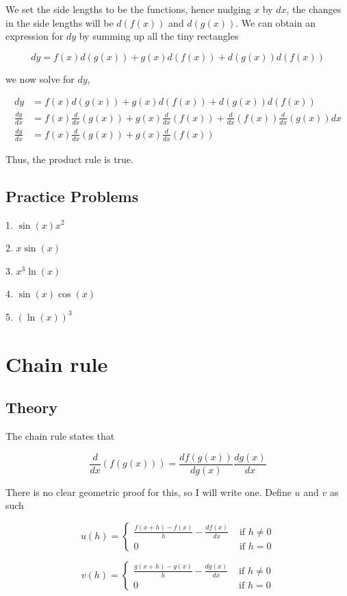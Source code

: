 \documentclass[a4paper,12pt,oneside]{book}
\begin{document}
\noindent We set the side lengths to be the functions, hence nudging $x$ by $dx$, the changes in the side lengths will be $d(f(x))$ and $d(g(x))$. We can obtain an expression for $dy$ by summing up all the tiny rectangles

$$dy=f(x)d(g(x))+g(x)d(f(x))+d(g(x))d(f(x))$$

\noindent we now solve for $dy$,

$$\begin{aligned}
dy&=f(x)d(g(x))+g(x)d(f(x))+d(g(x))d(f(x))\\
\frac{dy}{dx}&=f(x)\frac{d}{dx}(g(x))+g(x)\frac{d}{dx}(f(x))+\frac{d}{dx}(f(x))\frac{d}{dx}(g(x))dx\\
\frac{dy}{dx}&=f(x)\frac{d}{dx}(g(x))+g(x)\frac{d}{dx}(f(x))
\end{aligned}$$

\noindent Thus, the product rule is true.

\subsection{Practice Problems}

1. $\sin(x)x^2$

2. $x\sin(x)$

3. $x^3\ln(x)$

4. $\sin(x)\cos(x)$

5. $(\ln(x))^3$

\section{Chain rule}

\subsection{Theory}

The chain rule states that

$$\frac{d}{dx}(f(g(x)))=\frac{df(g(x))}{dg(x)}\frac{dg(x)}{dx}$$

\noindent There is no clear geometric proof for this, so I will write one. Define $u$ and $v$ as such

$$u(h)=\left\{ {\begin{array}{*{20}{l}}{\displaystyle \frac{{f( {x + h}) - f( x)}}{h} - \frac{df(x)}{dx}}&{{\mbox{  if }}h \ne 0}\\0&{{\mbox{  if }}h = 0}\end{array}} \right.$$

$$v(h)=\left\{ {\begin{array}{*{20}{l}}{\displaystyle \frac{{g( {x + h}) - g( x)}}{h} - \frac{dg(x)}{dx}}&{{\mbox{  if }}h \ne 0}\\0&{{\mbox{  if }}h = 0}\end{array}} \right.$$
\end{document}
